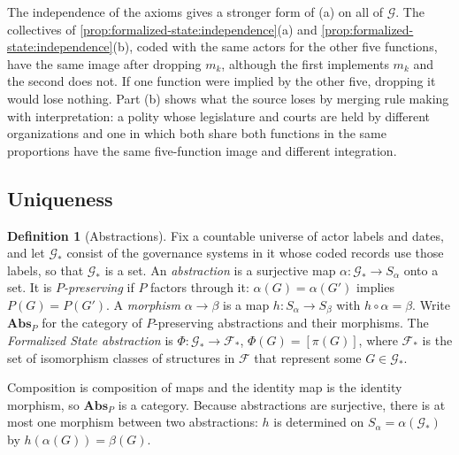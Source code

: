 \documentclass[11pt,letterpaper]{article}
\theoremstyle{definition}
\newtheorem{definition}[theorem]{Definition}
\theoremstyle{remark}
\begin{document}
The independence of the axioms gives a stronger form of (a) on all of $\mathcal{G}$. The collectives of \cref{prop:formalized-state:independence}(a) and \cref{prop:formalized-state:independence}(b), coded with the same actors for the other five functions, have the same image after dropping $m_k$, although the first implements $m_k$ and the second does not. If one function were implied by the other five, dropping it would lose nothing. Part (b) shows what the source loses by merging rule making with interpretation: a polity whose legislature and courts are held by different organizations and one in which both share both functions in the same proportions have the same five-function image and different integration.

\subsection{Uniqueness}

\begin{definition}[Abstractions]
\label{def:formalized-state:abstraction}
Fix a countable universe of actor labels and dates, and let $\mathcal{G}_*$ consist of the governance systems in it whose coded records use those labels, so that $\mathcal{G}_*$ is a set. An \emph{abstraction} is a surjective map $\alpha:\mathcal{G}_*\to S_\alpha$ onto a set. It is \emph{$P$-preserving} if $P$ factors through it: $\alpha(G)=\alpha(G')$ implies $P(G)=P(G')$. A \emph{morphism} $\alpha\to\beta$ is a map $h:S_\alpha\to S_\beta$ with $h\circ\alpha=\beta$. Write $\mathbf{Abs}_P$ for the category of $P$-preserving abstractions and their morphisms. The \emph{Formalized State abstraction} is $\Phi:\mathcal{G}_*\to\mathcal{F}_*$, $\Phi(G)=[\pi(G)]$, where $\mathcal{F}_*$ is the set of isomorphism classes of structures in $\mathcal{F}$ that represent some $G\in\mathcal{G}_*$.
\end{definition}

Composition is composition of maps and the identity map is the identity morphism, so $\mathbf{Abs}_P$ is a category. Because abstractions are surjective, there is at most one morphism between two abstractions: $h$ is determined on $S_\alpha=\alpha(\mathcal{G}_*)$ by $h(\alpha(G))=\beta(G)$.
\end{document}
